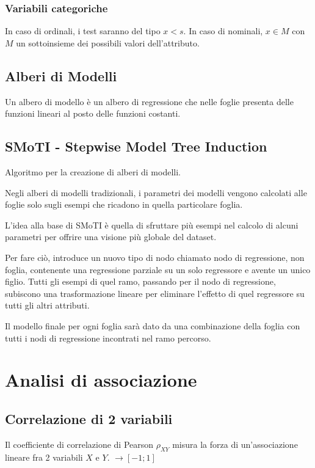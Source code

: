 \documentclass[11pt,onecolumn,a4paper,oneside]{book}
\begin{document}
\subsection{Variabili categoriche}
In caso di ordinali, i test saranno del tipo $x<s$.
In caso di nominali, $x \in M$ con $M$ un sottoinsieme dei possibili valori dell'attributo.

\section{Alberi di Modelli}
Un albero di modello è un albero di regressione che nelle foglie presenta delle funzioni lineari al posto delle funzioni costanti.

\section{SMoTI - Stepwise Model Tree Induction}
Algoritmo per la creazione di alberi di modelli.

Negli alberi di modelli tradizionali, i parametri dei modelli vengono calcolati alle foglie solo sugli esempi che ricadono in quella particolare foglia.

L'idea alla base di SMoTI è quella di sfruttare più esempi nel calcolo di alcuni parametri per offrire una visione più globale del dataset.

Per fare ciò, introduce un nuovo tipo di nodo chiamato nodo di regressione, non foglia, contenente una regressione parziale su un solo regressore e avente un unico figlio.
Tutti gli esempi di quel ramo, passando per il nodo di regressione, subiscono una trasformazione lineare per eliminare l'effetto di quel regressore su tutti gli altri attributi.

Il modello finale per ogni foglia sarà dato da una combinazione della foglia con tutti i nodi di regressione incontrati nel ramo percorso.


\chapter{Analisi di associazione}

	\section{Correlazione di 2 variabili}

Il coefficiente di correlazione di Pearson $\rho_{XY}$ misura la forza di un'associazione lineare fra 2 variabili $X$ e $Y$.
$\rightarrow [-1;1]$
\end{document}
